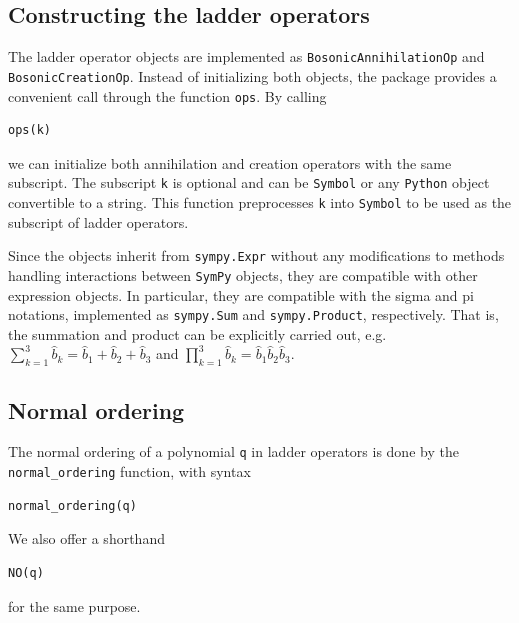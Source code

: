 \documentclass[5p, twocolumn, 10pt, sort&compress]{elsarticle}
\newcommand{\inlinecode}[1]{\texttt{#1}}
\newcommand{\bop}{\hat{b}}
\newenvironment{revision}{}{}
\newenvironment{revision2}{%
\color{red}
}
{}
\begin{document}

\subsection{Constructing the ladder operators}

\begin{revision}The ladder operator objects are implemented as \inlinecode{BosonicAnnihilationOp} and \inlinecode{BosonicCreationOp}. Instead of initializing both objects, the package provides a convenient call through the function \inlinecode{ops}.\end{revision} By calling
\begin{verbatim}
ops(k)
\end{verbatim}
we can initialize both annihilation and creation operators with the same subscript. The subscript \inlinecode{k} is optional and can be \inlinecode{Symbol} or any \texttt{Python} object convertible to a string. This function preprocesses \inlinecode{k} into \inlinecode{Symbol} to be used as the subscript of ladder operators. 

\begin{revision2}
Since the objects inherit from \inlinecode{sympy.Expr} without any modifications to methods handling interactions between \texttt{SymPy} objects, they are compatible with other expression objects. In particular, they are compatible with the sigma and pi notations, implemented as \inlinecode{sympy.Sum} and \inlinecode{sympy.Product}, respectively. That is, the summation and product can be explicitly carried out, e.g. $\sum_{k=1}^3 \bop_k = \bop_1+\bop_2+\bop_3$ and $\prod_{k=1}^3 \bop_k = \bop_1\bop_2\bop_3$.
\end{revision2}

\subsection{Normal ordering}
\label{subsec_normal_ordering}

The normal ordering of a polynomial \inlinecode{q} in ladder operators is done by the \inlinecode{normal_ordering} function, with syntax
\begin{verbatim}
normal_ordering(q)
\end{verbatim}
We also offer a shorthand
\begin{verbatim}
NO(q)
\end{verbatim}
for the same purpose.  
\end{document}
